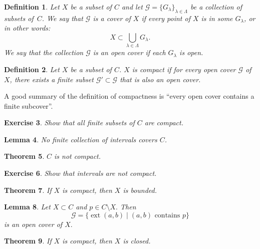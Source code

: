\documentclass{amsart}
\newtheorem{theorem}{Theorem}
\newtheorem{lemma}[theorem]{Lemma}
\newtheorem{definition}[theorem]{Definition}
\newtheorem{exercise}[theorem]{Exercise}
\newcommand{\1}{\mathds{1}}
\DeclareMathOperator{\ext}{ext}
\numberwithin{equation}{section}
\numberwithin{theorem}{section}
\begin{document}
\begin{definition}  Let $X$ be a subset of $C$ and let $\mathcal{G} = \{ G_{\lambda} \}_{\lambda \in \Lambda}$ be a collection of subsets of~$C$.  We say that $\mathcal{G}$ is a \emph{cover} of $X$ if every point of $X$ is in some $G_{\lambda}$, or in other words:
\[
X \subset \bigcup_{\lambda \in \Lambda} G_{\lambda}.
\]
We say that the collection $\mathcal{G}$ is an \emph{open cover} if each $G_{\lambda}$ is open.
\end{definition}

\begin{definition}  Let $X$ be a subset of $C$.  $X$ is \emph{compact} if for every open cover $\mathcal{G}$ of $X$, there exists a finite subset $\mathcal{G}' \subset \mathcal{G}$ that is also an open cover.
\end{definition}

\noindent  A good summary of the definition of compactness is ``every open cover contains a finite subcover''.


\begin{exercise}
Show that all finite subsets of $C$ are compact.
\end{exercise} 

\begin{lemma}
No finite collection of intervals covers $C$.
\end{lemma}

\begin{theorem}  
$C$ is not compact.

\end{theorem}


\begin{exercise}
Show that intervals are not compact.
\end{exercise} 

\begin{theorem}  \label{compactimpliesbounded} If $X$ is compact, then $X$ is bounded.
\end{theorem}


\begin{lemma}   Let $X\subset C$ and $p\in C\setminus X.$ Then
\[
\mathcal{G} = \{ \ext(a,b) \mid (a,b) \text{ contains } p  \}
\]
is an open cover of $X.$ 
\end{lemma}



\begin{theorem} \label{compactimpliesclosed} If $X$ is compact, then $X$ is closed.
\end{theorem}
\end{document}
